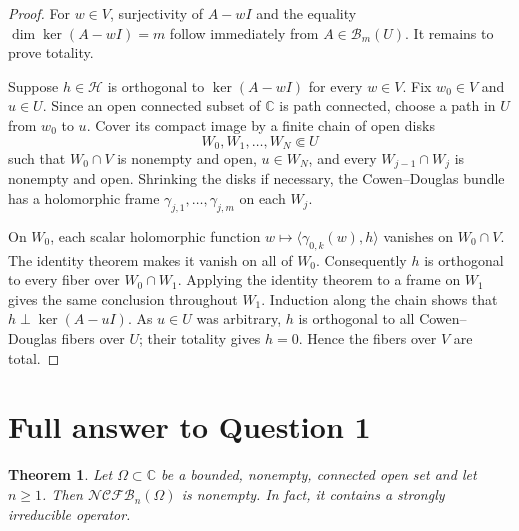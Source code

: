 \documentclass[11pt]{article}
\newtheorem{theorem}{Theorem}
\newcommand{\Bclass}{\mathcal B}
\newcommand{\NCFB}{\mathcal{NCFB}}
\begin{document}
\begin{proof}
For $w\in V$, surjectivity of $A-wI$ and the equality
$\dim\ker(A-wI)=m$ follow immediately from $A\in\Bclass_m(U)$.  It remains to
prove totality.

Suppose $h\in\mathcal H$ is orthogonal to $\ker(A-wI)$ for every $w\in V$.
Fix $w_0\in V$ and $u\in U$.  Since an open connected subset of $\mathbb C$
is path connected, choose a path in $U$ from $w_0$ to $u$.  Cover its compact
image by a finite chain of open disks
\[
 W_0,W_1,\ldots,W_N\Subset U
\]
such that $W_0\cap V$ is nonempty and open, $u\in W_N$, and every
$W_{j-1}\cap W_j$ is nonempty and open.  Shrinking the disks if necessary,
the Cowen--Douglas bundle has a holomorphic frame
$\gamma_{j,1},\ldots,\gamma_{j,m}$ on each $W_j$.

On $W_0$, each scalar holomorphic function
$w\mapsto\langle\gamma_{0,k}(w),h\rangle$ vanishes on $W_0\cap V$.
The identity theorem makes it vanish on all of $W_0$.  Consequently $h$ is
orthogonal to every fiber over $W_0\cap W_1$.  Applying the identity theorem
to a frame on $W_1$ gives the same conclusion throughout $W_1$.  Induction
along the chain shows that $h\perp\ker(A-uI)$.  As $u\in U$ was arbitrary,
$h$ is orthogonal to all Cowen--Douglas fibers over $U$; their totality gives
$h=0$.  Hence the fibers over $V$ are total.
\end{proof}

\section{Full answer to Question 1}

\begin{theorem}
\label{thm:main}
Let $\Omega\subset\mathbb C$ be a bounded, nonempty, connected open set and
let $n\geq1$.  Then $\NCFB_n(\Omega)$ is nonempty.  In fact, it contains a
strongly irreducible operator.
\end{theorem}
\end{document}
